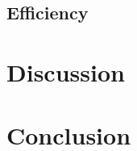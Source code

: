 \documentclass{article}
\begin{document}
\begin{multicols}{2}
\subsection{Efficiency}


\section{Discussion}


\section{Conclusion}



\end{multicols}
\end{document}
